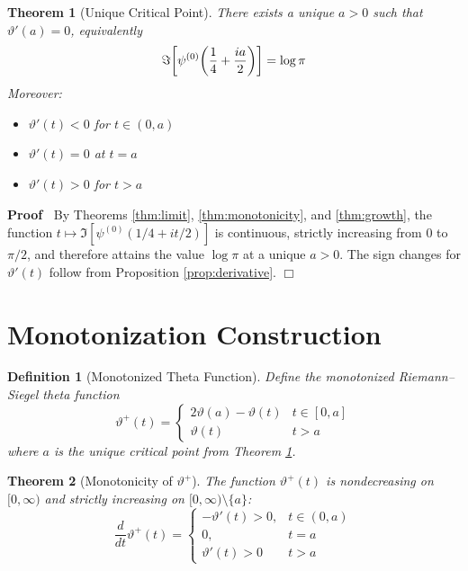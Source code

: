 \documentclass{article}
\newenvironment{proof}{\noindent\textbf{Proof\ }}{\hspace*{\fill}$\Box$\medskip}
\newtheorem{definition}{Definition}
\newtheorem{theorem}{Theorem}
\begin{document}
\begin{theorem}
  [Unique Critical Point]\label{thm:critical} There exists a unique $a > 0$
  such that $\vartheta' (a) = 0$, equivalently
  \begin{equation}
    \Im \hspace{-0.17em} \left[ \psi^{(0)}  \hspace{-0.17em} \left(
    \frac{1}{4} + \frac{ia}{2} \right) \right] = \log \pi
  \end{equation}
  Moreover:
  \begin{itemize}
    \item $\vartheta' (t) < 0$ for $t \in (0, a)$
    
    \item $\vartheta' (t) = 0$ at $t = a$
    
    \item $\vartheta' (t) > 0$ for $t > a$
  \end{itemize}
\end{theorem}

\begin{proof}
  By Theorems \ref{thm:limit}, \ref{thm:monotonicity}, and \ref{thm:growth},
  the function $t \mapsto \Im [\psi^{(0)} (1 / 4 + it / 2)]$ is continuous,
  strictly increasing from $0$ to $\pi / 2$, and therefore attains the value
  $\log \pi$ at a unique $a > 0$. The sign changes for $\vartheta' (t)$ follow
  from Proposition \ref{prop:derivative}.
\end{proof}

\section{Monotonization Construction}

\begin{definition}
  [Monotonized Theta Function]\label{def:monotonized} Define the monotonized
  Riemann--Siegel theta function
  \begin{equation}
    \vartheta^+ (t) = \left\{\begin{array}{ll}
      2 \vartheta (a) - \vartheta (t) & t \in [0, a]\\
      \vartheta (t) & t > a
    \end{array}\right.
  \end{equation}
  where $a$ is the unique critical point from Theorem \ref{thm:critical}.
\end{definition}

\begin{theorem}
  [Monotonicity of $\vartheta^+$]\label{thm:mono_construction} The function
  $\vartheta^+ (t)$ is nondecreasing on $[0, \infty)$ and strictly increasing
  on $[0, \infty) \setminus \{a\}$:
  \begin{equation}
    \frac{d}{dt} \vartheta^+ (t) = \left\{\begin{array}{ll}
      - \vartheta' (t) > 0, & t \in (0, a)\\
      0, & t = a\\
      \vartheta' (t) > 0 & t > a
    \end{array}\right.
  \end{equation}
\end{theorem}
\end{document}
